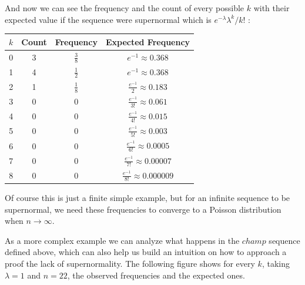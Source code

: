\documentclass[11pt,a4paper]{tesis}
\begin{document}
And now we can see the frequency and the count of every possible $k$ with their
 expected value if the sequence were supernormal which is ${e^{-\lambda}\lambda^k}/{k!}$ :

\begin{center}
    \begin{tabular}{|c | c |  c| c |} 
    \hline
    $k$ & Count &  Frequency & Expected Frequency \\ [0.1ex] 
    \hline
    0 & 3 & $\frac{3}{8}$ & $e^{-1} \approx	0.368 $ \\ [0.5ex] 
    \hline
    1 & 4 &$\frac{1}{2}$ & $e^{-1} \approx	0.368 $ \\  [0.5ex] 
    \hline
    2 & 1 &$\frac{1}{8}$ & $\frac{e^{-1}}{2} \approx	0.183$ \\  [0.5ex] 
    \hline
    3 & 0 & 0 & $\frac{e^{-1}}{3!}\approx	0.061 $ \\  [0.5ex] 
    \hline
    4 & 0 & 0 & $\frac{e^{-1}}{4!} \approx	0.015$ \\ [0.5ex] 
    \hline
    5 & 0 & 0 & $\frac{e^{-1}}{5!} \approx	0.003$ \\ [0.5ex] 
    \hline
    6 & 0 & 0  & $\frac{e^{-1}}{6!} \approx	0.0005$\\ [0.5ex] 
    \hline
    7 & 0 & 0 & $\frac{e^{-1}}{7!} \approx	0.00007$ \\ [0.5ex] 
    \hline
    8 & 0 & 0 & $\frac{e^{-1}}{8!} \approx	0.000009$ \\  [0.5ex] 
    \hline
   \end{tabular}
\end{center}

Of course this is just a finite simple example, but for an infinite sequence to be supernormal, we need these frequencies to converge to a Poisson distribution when $n \rightarrow \infty$. 

As a more complex example we can analyze what happens in the $champ$ sequence defined above, which can 
also help us build an intuition on how to approach a proof the lack of supernormality.
The following figure shows for every $k$, taking $\lambda = 1$ and $n = 22$, the observed frequencies and the expected ones.

\end{document}
